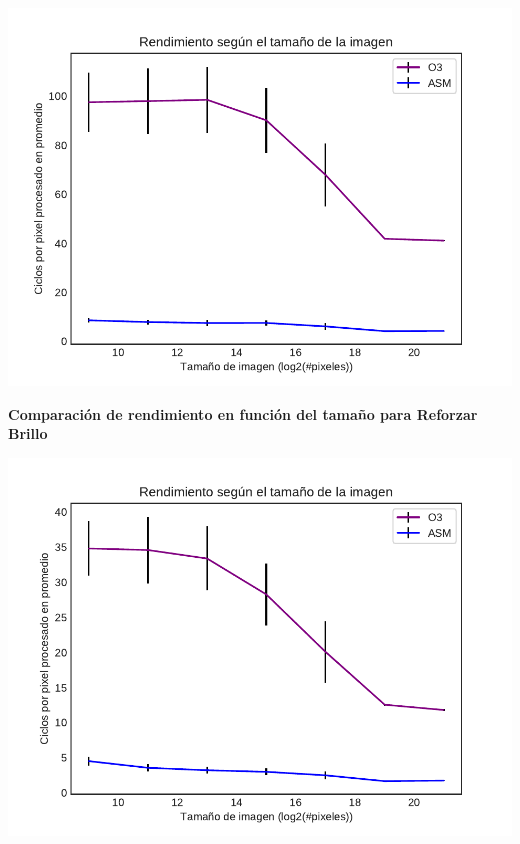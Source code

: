 \documentclass[a4paper]{article}
\begin{document}
\begin{center}
	\includegraphics[scale=0.6]{img/ColorBordesO3vsASM.pdf}
\end{center}	



\justify 
\begin{center}
	\textbf{Comparación de rendimiento en función del tamaño para Reforzar Brillo}
\end{center}

\begin{center}
	\includegraphics[scale=0.60]{img/ReforzarBrilloO3vsASM.pdf}
\end{center}
\end{document}
